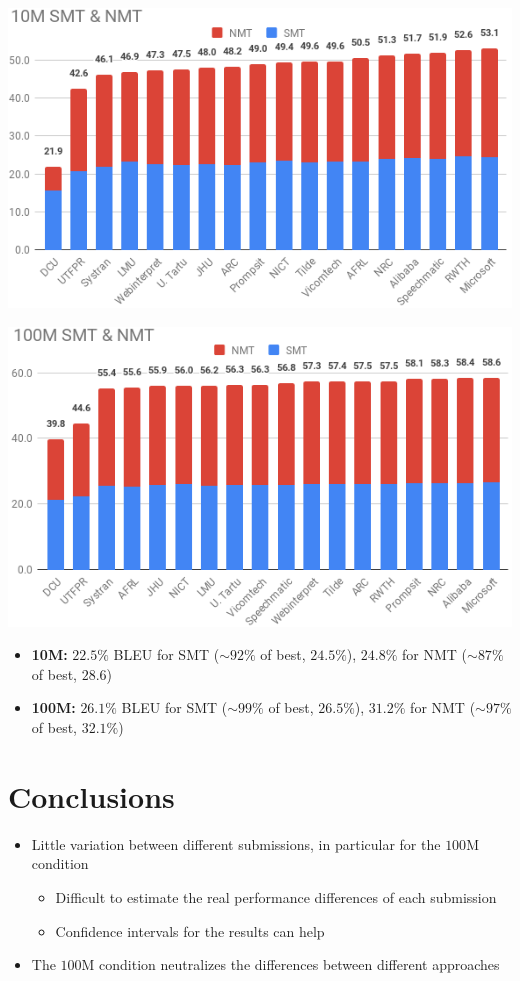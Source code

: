 \documentclass[a0]{sciposter}
\begin{document}
\begin{multicols*}{2}
\begin{center}
\includegraphics[width=0.85\columnwidth]{assets/10M_crop.png}

\includegraphics[width=0.85\columnwidth]{assets/100M_crop.png}
\end{center}

\begin{itemize}
  \item {\bf 10M:} $22.5\%$ BLEU for SMT ($\sim92\%$ of best, $24.5\%$), $24.8\%$ for NMT ($\sim87\%$ of best, $28.6$)
  \item {\bf 100M:} $26.1\%$ BLEU for SMT ($\sim99\%$ of best, $26.5\%$), $31.2\%$ for NMT ($\sim97\%$ of best, $32.1\%$)
\end{itemize} 


\section*{\Large Conclusions}
\begin{itemize}
  \item Little variation between different submissions, in particular for the $100$M condition
  \begin{itemize}
    \item Difficult to estimate the real performance differences of each submission
    \item Confidence intervals for the results can help
  \end{itemize}
  \item The $100$M condition %
  neutralizes the differences between different approaches
\end{itemize}




\end{multicols*}
\end{document}
